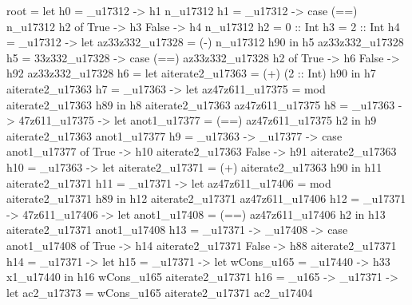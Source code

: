 root = let
         h0 = \n_u17312 -> h1 n_u17312
         h1 = \n_u17312 -> case (==) n_u17312 h2 of
                             True -> h3
                             False -> h4 n_u17312
         h2 = 0 :: Int
         h3 = 2 :: Int
         h4 = \n_u17312 -> let az33z332_u17328 = (-) n_u17312 h90
                           in h5 az33z332_u17328
         h5 = \az33z332_u17328 -> case (==) az33z332_u17328 h2 of
                                    True -> h6
                                    False -> h92 az33z332_u17328
         h6 = let aiterate2_u17363 = (+) (2 :: Int) h90
              in h7 aiterate2_u17363
         h7 = _u17363 -> let
                                     az47z611_u17375 = mod aiterate2_u17363 h89
                                   in h8 aiterate2_u17363 az47z611_u17375
         h8 = _u17363 -> \az47z611_u17375 -> let
                                                         anot1_u17377 = (==) az47z611_u17375 h2
                                                       in h9 aiterate2_u17363 anot1_u17377
         h9 = _u17363 -> _u17377 -> case anot1_u17377 of
                                                      True -> h10 aiterate2_u17363
                                                      False -> h91 aiterate2_u17363
         h10 = _u17363 -> let
                                      aiterate2_u17371 = (+) aiterate2_u17363 h90
                                    in h11 aiterate2_u17371
         h11 = _u17371 -> let
                                      az47z611_u17406 = mod aiterate2_u17371 h89
                                    in h12 aiterate2_u17371 az47z611_u17406
         h12 = _u17371 -> \az47z611_u17406 -> let
                                                          anot1_u17408 = (==) az47z611_u17406 h2
                                                        in h13 aiterate2_u17371 anot1_u17408
         h13 = _u17371 -> _u17408 -> case anot1_u17408 of
                                                       True -> h14 aiterate2_u17371
                                                       False -> h88 aiterate2_u17371
         h14 = _u17371 -> let
                                      h15 = _u17371 -> let
                                                                   wCons_u165 = _u17440 -> h33 x1_u17440
                                                                 in h16 wCons_u165 aiterate2_u17371
                                      h16 = \wCons_u165 -> _u17371 -> let
                                                                                  ac2_u17373 = wCons_u165 aiterate2_u17371 ac2_u17404
